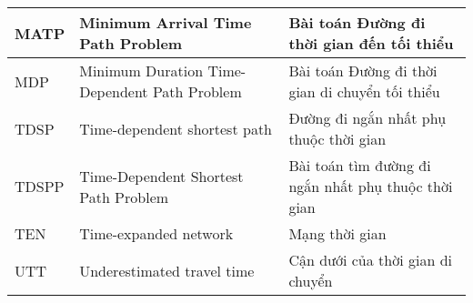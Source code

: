 \documentclass[fontsize=14pt,DIV=15pt,twoside=false]{scrbook}
\renewcommand{\baselinestretch}{1.3}
\newcommand{\toc}[0]{
\renewcommand{\baselinestretch}{1.0}
\tableofcontents
\renewcommand{\baselinestretch}{1.2}
\listoffigures
\listoftables
\listofalgorithms
\renewcommand{\baselinestretch}{1.3}
}
\begin{document}
\begin{table}[h]
\begin{tabularx}{\textwidth}{|p{1.5cm}|X|X|}
    MATP             & Minimum Arrival Time Path Problem                 & Bài toán Đường đi thời gian đến tối thiểu                                           \\ \midrule
    MDP              & Minimum Duration Time-Dependent Path Problem      & Bài toán Đường đi thời gian di chuyển tối thiểu                                     \\ \midrule
    TDSP             & Time-dependent shortest path                      & Đường đi ngắn nhất phụ thuộc thời gian                                              \\ \midrule
    TDSPP            & Time-Dependent Shortest Path Problem              & Bài toán tìm đường đi ngắn nhất phụ thuộc thời gian                                 \\ \midrule
    TEN              & Time-expanded network                             & Mạng thời gian                                                                      \\ \midrule
    UTT              & Underestimated travel time                        & Cận dưới của thời gian di chuyển                                                    \\ \bottomrule
    \end{tabularx}
\end{table}

\toc

%
%
%



\printbibliography
%

\backmatter
\end{document}
